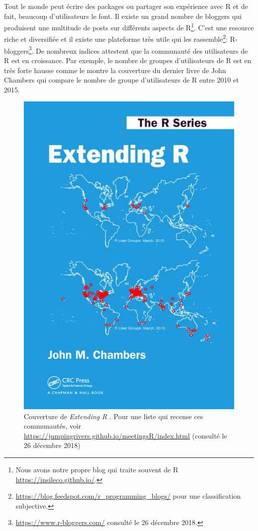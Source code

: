 \documentclass[]{article}
\begin{document}
Tout le monde peut écrire des packages ou partager son expérience avec R et de fait, beaucoup d'utilisateurs le font. Il existe un grand nombre de bloggers qui produisent une multitude de posts sur différents aspects de R\footnote{Nous avons notre propre blog qui traite souvent de R \url{https://insileco.github.io/}.}. C'est une resource riche et diversifiée et il existe une plateforme très utile qui les rassemble\footnote{\url{https://blog.feedspot.com/r_programming_blogs/} pour une classification subjective.}: R-bloggers\footnote{\url{https://www.r-bloggers.com/} consulté le 26 décembre 2018.}. De nombreux indices attestent que la communauté des utilisateurs de R est en croissance. Par exemple, le nombre de groupes d'utilisateurs de R est en très forte hausse comme le montre la couverture du dernier livre de John Chambers qui compare le nombre de groupe d'utilisateurs de R entre 2010 et 2015.

\begin{figure}
\centering
\includegraphics{img/chap2/extendingR.jpg}
\caption{Couverture de \emph{Extending R} \citep{chambers_extending_2016}. Pour une liste qui recense ces communautés, voir \url{https://jumpingrivers.github.io/meetingsR/index.html} (consulté le 26 décembre 2018)}
\end{figure}
\end{document}
